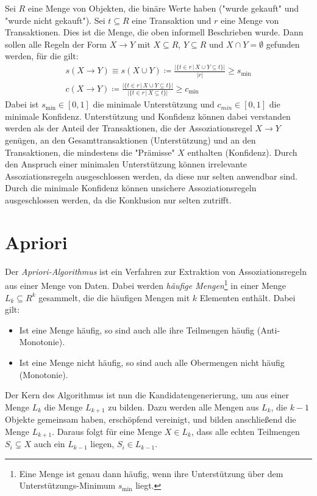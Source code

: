 	Sei \(R\) eine Menge von Objekten, die binäre Werte haben ("wurde gekauft" und "wurde nicht gekauft"). Sei \( t \subseteq R \) eine Transaktion und \(r\) eine Menge von Transaktionen. Dies ist die Menge, die oben informell Beschrieben wurde. Dann sollen alle Regeln der Form \( X \to Y \) mit \( X \subseteq R \), \( Y \subseteq R \) und \( X \cap Y = \emptyset \) gefunden werden, für die gilt:
	\begin{gather}
		s(X \to Y) \equiv s(X \cup Y) \coloneqq \frac{\bigl\lvert \{ t \in r \,\vert\, X \cup Y \subseteq t \} \bigr\rvert}{\lvert r \rvert} \geq s_\mathrm{min} \\
		c(X \to Y) \coloneqq \frac{\bigl\lvert \{ t \in r \,\vert\, X \cup Y \subseteq t \} \bigr\rvert}{\bigl\lvert \{ t \in r \,\vert\, X \subseteq t \} \bigr\rvert} \geq c_\mathrm{min}
	\end{gather}
	Dabei ist \(s_\mathrm{min} \in [0, 1] \) die minimale Unterstützung und \( c_\mathit{min} \in [0, 1] \) die minimale Konfidenz. Unterstützung und Konfidenz können dabei verstanden werden als der Anteil der Transaktionen, die der Assoziationsregel \(X \to Y\) genügen, an den Gesamttransaktionen (Unterstützung) und an den Transaktionen, die mindestens die "Prämisse" \(X\) enthalten (Konfidenz). Durch den Anspruch einer minimalen Unterstützung können irrelevante Assoziationsregeln ausgeschlossen werden, da diese nur selten anwendbar sind. Durch die minimale Konfidenz können unsichere Assoziationsregeln ausgeschlossen werden, da die Konklusion nur selten zutrifft.

	\section{Apriori}
		Der \emph{Apriori-Algorithmus} ist ein Verfahren zur Extraktion von Assoziationsregeln aus einer Menge von Daten. Dabei werden \emph{häufige Mengen}\footnote{Eine Menge ist genau dann häufig, wenn ihre Unterstützung über dem Unterstützungs-Minimum \(s_\mathrm{min}\) liegt.} in einer Menge \( L_k \subseteq R^k \) gesammelt, die die häufigen Mengen mit \(k\) Elementen enthält. Dabei gilt:
		\begin{itemize}
			\item Ist eine Menge häufig, so sind auch alle ihre Teilmengen häufig (Anti-Monotonie).
			\item Ist eine Menge nicht häufig, so sind auch alle Obermengen nicht häufig (Monotonie).
		\end{itemize}
		Der Kern des Algorithmus ist nun die Kandidatengenerierung, um aus einer Menge \(L_k\) die Menge \(L_{k + 1}\) zu bilden. Dazu werden alle Mengen aus \(L_k\), die \(k - 1\) Objekte gemeinsam haben, erschöpfend vereinigt, und bilden anschließend die Menge \(L_{k + 1}\). Daraus folgt für eine Menge \( X \in L_k \), dass alle echten Teilmengen \( S_i \subsetneq X \) auch ein \(L_{k - 1}\) liegen, \dh \( S_i \in L_{k - 1} \).

